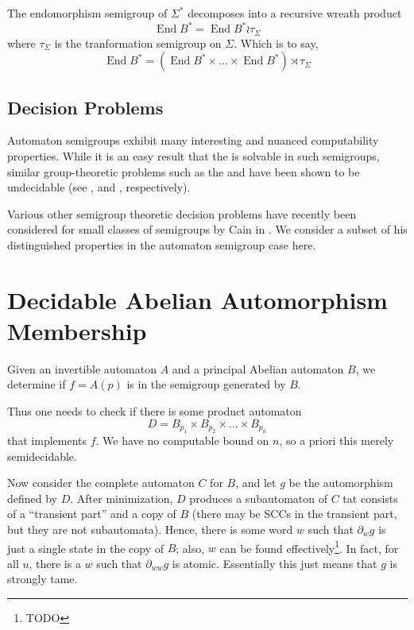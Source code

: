 \documentclass[10pt]{article}
\begin{document}
The endomorphism semigroup of $\Sigma^*$ decomposes into a recursive
wreath product
\[
  \operatorname{End}B^* = \operatorname{End}B^* \wr \tau_\Sigma
\]
where $\tau_\Sigma$ is the tranformation semigroup on $\Sigma$. Which
is to say,
\[
  \operatorname{End}B^* = (\operatorname{End}B^* \times \ldots \times
  \operatorname{End}B^* ) \rtimes \tau_\Sigma
\]



\subsection*{Decision Problems}
Automaton semigroups exhibit many interesting and nuanced
computability properties. While it is an easy result that the
 is solvable in such semigroups, similar
group-theoretic problems such as the  and
 have been shown to be undecidable
(see \cite{sunic:conj}, and \cite{gillibert:finite}, respectively).

Various other semigroup theoretic decision problems have recently been
considered for small classes of semigroups by Cain in
\cite{Cain09:dec_prob}. We consider a subset of his distinguished
properties in the automaton semigroup case here.


\section{Decidable Abelian Automorphism Membership}


Given an invertible automaton $A$ and a principal Abelian automaton
$B$, we determine if $f = A(p)$ is in the semigroup generated by $B$.

Thus one needs to check if there is some product automaton
\[
  D = B_{p_1} \times B_{p_2} \times \ldots \times B_{p_n}
\]
that implements $f$. We have no computable bound on $n$, so a priori
this merely semidecidable.

Now consider the complete automaton $C$ for $B$, and let $g$ be the
automorphism defined by $D$. After minimization, $D$ produces a
subautomaton of $C$ tat consists of a ``transient part'' and a copy of
$B$ (there may be SCCs in the transient part, but they are not
subautomata). Hence, there is some word $w$ such that $\partial_w g$
is just a single state in the copy of $B$; also, $w$ can be found
effectively\footnote{TODO}. In fact, for all $u$, there is a $w$ such
that $\partial_{ww}g$ is atomic. Essentially this just means that $g$
is strongly tame.
\end{document}
